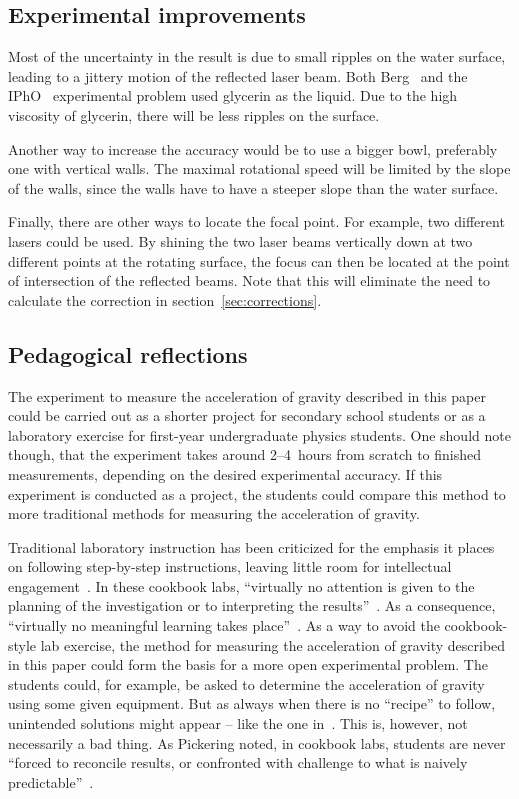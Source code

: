 \documentclass[12pt, a4paper, twocolumn]{article}
\begin{document}
\subsection{Experimental improvements}

Most of the uncertainty in the result is due to small ripples on the water surface, leading to a jittery motion of the reflected laser beam. Both Berg~\cite{Berg1990} and the IPhO~\cite{IPhO2001} experimental problem used glycerin as the liquid. Due to the high viscosity of glycerin, there will be less ripples on the surface.

Another way to increase the accuracy would be to use a bigger bowl, preferably one with vertical walls. The maximal rotational speed will be limited by the slope of the walls, since the walls have to have a steeper slope than the water surface.

Finally, there are other ways to locate the focal point. For example, two different lasers could be used. By shining the two laser beams vertically down at two different points at the rotating surface, the focus can then be located at the point of intersection of the reflected beams. Note that this will eliminate the need to calculate the correction in section~\ref{sec:corrections}. 

\subsection{Pedagogical reflections}

The experiment to measure the acceleration of gravity described in
this paper could be carried out as a shorter project for secondary
school students or as a laboratory exercise for first-year
undergraduate physics students. One should note though, that the
experiment takes around 2--4~hours from scratch to finished
measurements, depending on the desired experimental accuracy. If this
experiment is conducted as a project, the students could compare this
method to more traditional methods for measuring the acceleration of
gravity.

Traditional laboratory instruction has been criticized for the
emphasis it places on following step-by-step instructions, leaving
little room for intellectual engagement~\cite{Domin1999}. In these
cookbook labs, ``virtually no attention is given to the planning of
the investigation or to interpreting the
results''~\cite{Domin1999}. As a consequence, ``virtually no
meaningful learning takes place''~\cite{Domin1999}. As a way to avoid
the cookbook-style lab exercise, the method for measuring the
acceleration of gravity described in this paper could form the basis
for a more open experimental problem. The students could, for example,
be asked to determine the acceleration of gravity using some given
equipment. But as always when there is no ``recipe'' to follow,
unintended solutions might appear – like the one
in~\cite{IPhO2001}. This is, however, not necessarily a bad thing. As
Pickering noted, in cookbook labs, students are never ``forced to
reconcile results, or confronted with challenge to what is naively
predictable''~\cite{Pickering1987}.
\end{document}
